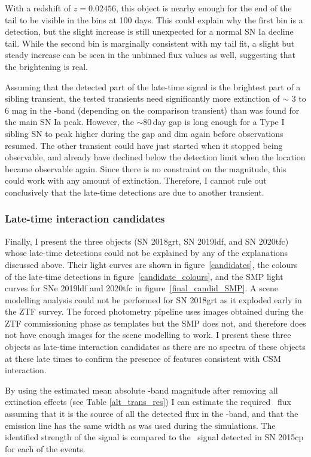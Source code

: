 \documentclass[a4paper,oneside,12pt, class=Latex/Classes/PhDthesisPSnPDF, crop=false]{standalone}
\begin{document}
With a redshift of $z = 0.02456$, this object is nearby enough for the end of the tail to be visible in the bins at 100 days. This could explain why the first bin is a detection, but the slight increase is still unexpected for a normal SN Ia decline tail. While the second bin is marginally consistent with my tail fit, a slight but steady increase can be seen in the unbinned flux values as well, suggesting that the brightening is real.

Assuming that the detected part of the late-time signal is the brightest part of a sibling transient, the tested transients need significantly more extinction of $\sim$ 3 to 6 mag in the \ztfr-band (depending on the comparison transient) than was found for the main SN Ia peak. However, the $\sim 80$\,day gap is long enough for a Type I sibling SN to peak higher during the gap and dim again before observations resumed. The other transient could have just started when it stopped being observable, and already have declined below the detection limit when the location became observable again. Since there is no constraint on the magnitude, this could work with any amount of extinction. Therefore, I cannot rule out conclusively that the late-time detections are due to another transient.\\


\subsubsection{Late-time interaction candidates}
\label{sec:late_time_cand}
Finally, I present the three objects (SN 2018grt, SN 2019ldf, and SN 2020tfc) whose late-time detections could not be explained by any of the explanations discussed above. Their light curves are shown in figure~\ref{candidates}, the colours of the late-time detections in figure~\ref{candidate_colours}, and the SMP light curves for SNe 2019ldf and 2020tfc in figure~\ref{final_candid_SMP}. A scene modelling analysis could not be performed for SN 2018grt as it exploded early in the ZTF survey. The forced photometry pipeline uses images obtained during the ZTF commissioning phase as templates but the SMP does not, and therefore does not have enough images for the scene modelling to work. I present these three objects as late-time interaction candidates as there are no spectra of these objects at these late times to confirm the presence of features consistent with CSM interaction.

By using the estimated mean absolute \ztfr-band magnitude after removing all extinction effects (see Table \ref{alt_trans_res}) I can estimate the required \Halpha~flux assuming that it is the source of all the detected flux in the \ztfr-band, and that the emission line has the same width as was used during the simulations. The identified strength of the signal is compared to the \Halpha~signal detected in SN 2015cp for each of the events.\\ \\ \\
\end{document}
